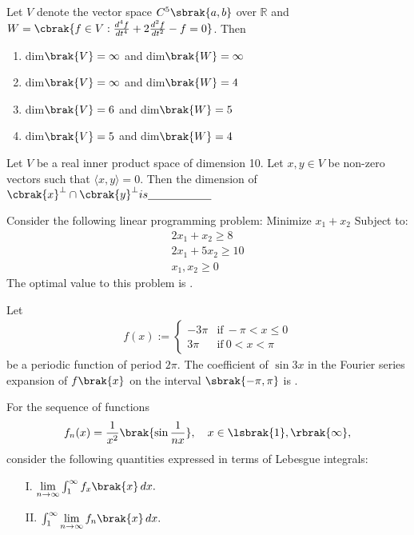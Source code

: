   \item Let $V$ denote the vector space $C^5\sbrak{a, b}$ over $\mathbb{R}$ and $W = \cbrak{ f \in V : \frac{d^4 f}{dt^4} + 2 \frac{d^2 f}{dt^2} - f = 0}$. Then
  \begin{enumerate}
    \item dim$\brak{V} = \infty$ and dim$\brak{W} = \infty$
    \item dim$\brak{V} = \infty$ and dim$\brak{W} = 4$
    \item dim$\brak{V} = 6$ and dim$\brak{W} = 5$
    \item dim$\brak{V} = 5$ and dim$\brak{W} = 4$
\end{enumerate}
\item Let $V$ be a real inner product space of dimension 10. Let $x, y \in V$ be non-zero vectors such that $\langle x, y \rangle = 0$. Then the dimension of $\cbrak{x}^\perp \cap \cbrak{y}^\perp is \underline{\hspace{2cm}}$
\item Consider the following linear programming problem: Minimize $x_1 + x_2$ Subject to:
\begin{align}
2x_1 + x_2 \geq 8 \\ 2x_1 + 5x_2 \geq 10 \\ x_1, x_2 \geq 0
\end{align}
The optimal value to this problem is \underline{\hspace{2cm}}.
\item Let \begin{align} 
f(x) :=\begin{cases}
-3\pi & \text{if} \ -\pi < x \leq 0 \\
3\pi & \text{if} \ 0 < x < \pi
\end{cases} 
\end{align} 
be a periodic function of period $2\pi$. The coefficient of $\sin 3x$ in the Fourier series expansion of $f\brak{x}$ on the interval $\sbrak{-\pi, \pi}$ is \underline{\hspace{2cm}}. \item For the sequence of functions 
\begin{align}
f_n(x) = \frac{1}{x^2} \brak{\sin\frac{1}{n x}}, \quad x \in \lsbrak{1}, \rbrak{\infty},
\end{align}
consider the following quantities expressed in terms of Lebesgue integrals:
\begin{enumerate}
    \item[I.] $\lim\limits_{n \to \infty} \int_1^\infty f_x\brak{x} \, dx.$
    \item[II.] $\int_1^\infty \lim\limits_{n \to \infty} f_n\brak{x} \, dx.$
\end{enumerate}
